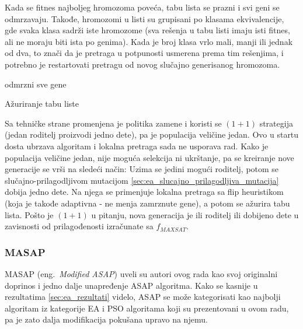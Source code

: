 \documentclass[a4paper]{article}
\begin{document}
Kada se fitnes najboljeg hromozoma poveća, tabu lista se prazni i svi geni se odmrzavaju.
Takođe, hromozomi u listi su grupisani po klasama ekvivalencije, gde svaka klasa sadrži
iste hromozome (sva rešenja u tabu listi imaju isti fitnes, 
ali ne moraju biti ista po genima). Kada je broj klasa vrlo mali, manji ili jednak od dva,
to znači da je pretraga u potpunosti usmerena prema tim rešenjima, i potrebno je restartovati
pretragu od novog slučajno generisanog hromozoma. \\

\begin{algorithm}[H]
\SetAlgoLined
{}

\BlankLine
 odmrzni sve gene\;
 \caption{Ažuriranje tabu liste}
\end{algorithm}

Sa tehničke strane promenjena je politika zamene i koristi se $(1+1)$ strategija 
(jedan roditelj proizvodi jedno dete), pa je populacija veličine jedan. Ovo u startu dosta
ubrzava algoritam i lokalna pretraga sada ne usporava rad.
Kako je populacija veličine jedan, nije moguća selekcija ni ukrštanje, 
pa se kreiranje nove generacije se vrši na sledeći način: 
Uzima se jedini mogući roditelj, potom se slučajno-prilagodljivom mutacijom
\ref{sec:ea_slucajno_prilagodljiva_mutacija} dobija jedno dete. 
Na njega se primenjuje lokalna pretraga sa flip heuristikom (koja je takođe adaptivna - 
ne menja zamrznute gene), a potom se ažurira tabu lista.
Pošto je $(1+1)$ u pitanju, nova generacija je ili roditelj ili dobijeno dete 
u zavisnosti od prilagođenosti izračunate sa $f_{MAXSAT}$.


\subsubsection{MASAP}
\label{sec:ea_masap}
MASAP (eng.~{\em Modified ASAP}) uveli su autori ovog rada kao svoj originalni doprinos 
i jedno dalje unapređenje ASAP algoritma. Kako se kasnije u rezultatima
\ref{sec:ea_rezultati} videlo, ASAP se može kategorisati kao najbolji 
algoritam iz kategorije EA i PSO algoritama koji su prezentovani u ovom radu, 
pa je zato dalja modifikacija pokušana upravo na njemu. \\
\end{document}
